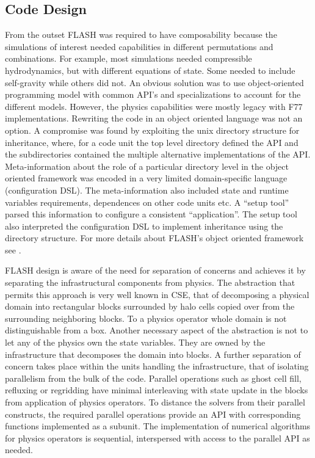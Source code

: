 \subsection{Code Design}
\label{sec:FLASHdesign}
From the outset FLASH was required to have composability because the
simulations of interest needed capabilities in different permutations
and combinations. For example, most simulations needed compressible
hydrodynamics, but with different equations of state. Some needed to
include self-gravity while others did not. An 
obvious solution was to use object-oriented programming model with
common API's and specializations to account for the different
models. However, the physics capabilities were mostly legacy with F77
implementations. Rewriting the code in an object oriented language was
not an option. A compromise was found by exploiting the unix directory
structure for inheritance, where, for a code unit the top level
directory defined the API and the subdirectories contained the
multiple alternative implementations of the API.  Meta-information
about the role of a particular directory level in the object oriented framework
was encoded in a very limited domain-specific language (configuration
DSL). The meta-information also included state and runtime variables
requirements, dependences on other code units etc. A ``setup tool''
parsed this information to configure a consistent ``application''. The
setup tool also interpreted the configuration DSL to implement 
inheritance using the directory structure. For more details about
FLASH's object oriented framework see \cite{Dubey2009}.   

FLASH design is aware of the need for separation of concerns and
achieves it by separating the infrastructural components
from physics. The abstraction that permits this approach is very
well known in CSE, that of decomposing a physical domain into
rectangular blocks surrounded by halo cells copied over from the
surrounding neighboring blocks. To a physics operator whole domain is
not distinguishable from a box. Another necessary aspect of the abstraction 
is not to let any of the  physics own the state
variables. They are owned by the infrastructure that 
decomposes the domain into blocks. A further separation of concern
takes place within the units handling the infrastructure, that of
isolating parallelism from the bulk of the code. Parallel
operations such as ghost cell fill, refluxing or regridding have
minimal interleaving with state update in the blocks from application
of physics operators. To distance the solvers from their parallel
constructs, the required parallel operations provide an API with
corresponding functions implemented as a subunit. The implementation
of numerical algorithms for physics operators is sequential,
interspersed with access to the parallel API as needed. 

